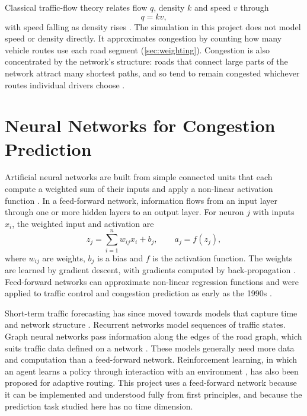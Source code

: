 \documentclass[12pt]{report}
\begin{document}
Classical traffic-flow theory relates flow $q$, density $k$ and speed $v$ through
\begin{equation}
q = k v,
\end{equation}
with speed falling as density rises \citep{greenshields1935}. The simulation in this project does not model speed or density directly. It approximates congestion by counting how many vehicle routes use each road segment (\cref{sec:weighting}). Congestion is also concentrated by the network's structure: roads that connect large parts of the network attract many shortest paths, and so tend to remain congested whichever routes individual drivers choose \citep{barthelemy2011spatial,calatayud2021congestion}.

\section{Neural Networks for Congestion Prediction}

Artificial neural networks are built from simple connected units that each compute a weighted sum of their inputs and apply a non-linear activation function \citep{krogh2008ann}. In a feed-forward network, information flows from an input layer through one or more hidden layers to an output layer. For neuron $j$ with inputs $x_i$, the weighted input and activation are
\begin{equation}
z_j = \sum_{i=1}^{n} w_{ij} x_i + b_j, \qquad a_j = f(z_j),
\end{equation}
where $w_{ij}$ are weights, $b_j$ is a bias and $f$ is the activation function. The weights are learned by gradient descent, with gradients computed by back-propagation \citep{goodfellow2016deep}. Feed-forward networks can approximate non-linear regression functions \citep{arulampalam2003generalized} and were applied to traffic control and congestion prediction as early as the 1990s \citep{gilmore1995neural}.

Short-term traffic forecasting has since moved towards models that capture time and network structure \citep{vlahogianni2004short,vlahogianni2014short}. Recurrent networks model sequences of traffic states. Graph neural networks pass information along the edges of the road graph, which suits traffic data defined on a network \citep{wu2021comprehensive,jiang2022gnn}. These models generally need more data and computation than a feed-forward network. Reinforcement learning, in which an agent learns a policy through interaction with an environment \citep{sutton2018reinforcement}, has also been proposed for adaptive routing. This project uses a feed-forward network because it can be implemented and understood fully from first principles, and because the prediction task studied here has no time dimension.
\end{document}
